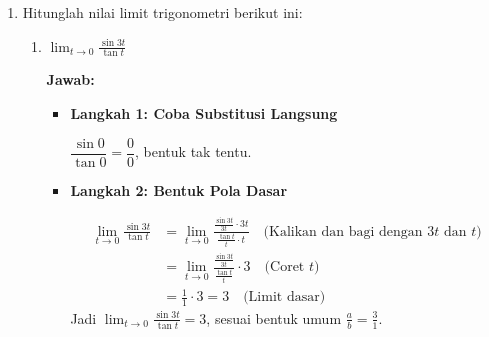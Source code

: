 \documentclass[10pt,a4paper]{article}
\newcounter{eqblock}
\newcommand{\reseteq}{%
  \stepcounter{eqblock}%
  \setcounter{equation}{0}%
  \renewcommand{\theHequation}{\arabic{eqblock}.\arabic{equation}}%
}
\begin{document}
\begin{enumerate}
\begin{enumerate}
\begin{itemize}
\begin{center}
\end{center}
Kedua potongan bersambung di titik $(1,2)$, sesuai dengan $\displaystyle\lim_{x \to 1} f(x) = 2$.
\end{itemize}

\end{enumerate}

\item Hitunglah nilai limit trigonometri berikut ini:
\begin{enumerate}

\item $\displaystyle\lim_{t \to 0} \frac{\sin 3t}{\tan t}$

\textbf{Jawab:}
\begin{itemize}
\item \textbf{Langkah 1: Coba Substitusi Langsung}

$\dfrac{\sin 0}{\tan 0} = \dfrac{0}{0}$, bentuk tak tentu.

\item \textbf{Langkah 2: Bentuk Pola Dasar}

\reseteq
\begin{align}
\lim_{t \to 0} \frac{\sin 3t}{\tan t} &= \lim_{t \to 0} \frac{\frac{\sin 3t}{3t} \cdot 3t}{\frac{\tan t}{t} \cdot t} \quad \text{(Kalikan dan bagi dengan $3t$ dan $t$)} \\
&= \lim_{t \to 0} \frac{\frac{\sin 3t}{3t}}{\frac{\tan t}{t}} \cdot 3 \quad \text{(Coret $t$)} \\
&= \frac{1}{1} \cdot 3 = 3 \quad \text{(Limit dasar)}
\end{align}
Jadi $\displaystyle\lim_{t \to 0} \frac{\sin 3t}{\tan t} = 3$, sesuai bentuk umum $\frac{a}{b} = \frac{3}{1}$.
\end{itemize}


\end{enumerate}
\end{enumerate}
\end{document}
